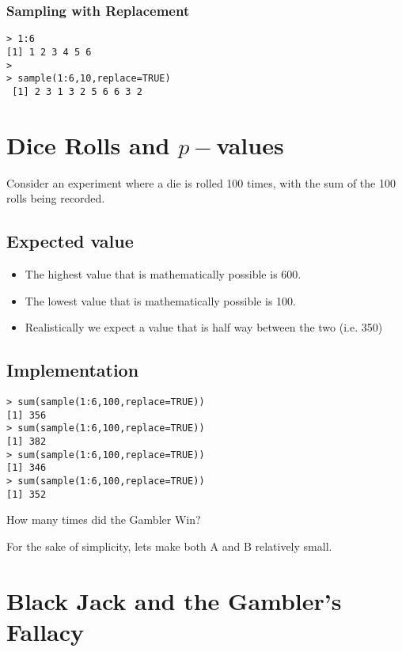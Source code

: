 \subsubsection{Sampling with Replacement}


\begin{framed}
\begin{verbatim}
> 1:6
[1] 1 2 3 4 5 6
> 
> sample(1:6,10,replace=TRUE)
 [1] 2 3 1 3 2 5 6 6 3 2
\end{verbatim}
\end{framed}

\newpage
\section{Dice Rolls and $p-$values}
Consider an experiment where a die is rolled 100 times, with the sum of the 100 rolls being recorded.
\subsection{Expected value}
\begin{itemize}
\item The highest value that is mathematically possible is 600.
\item The lowest value that is mathematically possible is 100.
\item Realistically we expect a value that is half way between the two (i.e. 350)
\end{itemize}
\subsection{Implementation}
\begin{framed}
\begin{verbatim}
> sum(sample(1:6,100,replace=TRUE))
[1] 356
> sum(sample(1:6,100,replace=TRUE))
[1] 382
> sum(sample(1:6,100,replace=TRUE))
[1] 346
> sum(sample(1:6,100,replace=TRUE))
[1] 352
\end{verbatim}
\end{framed}


How many times did the Gambler Win?

For the sake of simplicity, lets make both A and B relatively small.

\newpage
\section{Black Jack and the Gambler's Fallacy}

